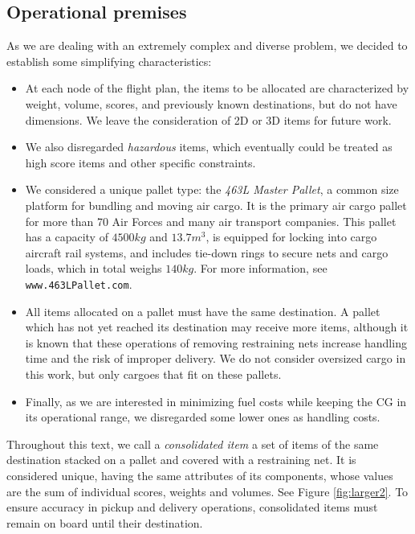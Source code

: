 \documentclass[preprint,authoryear]{elsarticle}
\begin{document}
\subsection{Operational premises}

As we are dealing with an extremely complex and diverse problem, we decided to establish some simplifying characteristics:

\begin{itemize}
	
	\item At each node of the flight plan, the items to be allocated are characterized by weight, volume, scores, and previously known destinations, but do not have dimensions. We leave the consideration of 2D or 3D items for future work.
	
	\item We also disregarded {\it hazardous} items, which eventually could be treated as high score items and other specific constraints.
	
	\item We considered a unique pallet type: the {\it 463L Master Pallet}, a common size platform for bundling and moving air cargo. It is the primary air cargo pallet for more than 70 Air Forces and many air transport companies. This pallet has a capacity of $4500 kg$ and $13.7 m^3$, is equipped for locking into cargo aircraft rail systems, and includes tie-down rings to secure nets and cargo loads, which in total weighs $140 kg$. For more information, see {\tt www.463LPallet.com}.
	
	\item All items allocated on a pallet must have the same destination. A pallet which has not yet reached its destination may receive more items, although it is known that these operations of removing restraining nets increase handling time and the risk of improper delivery. We do not consider oversized cargo in this work, but only cargoes that fit on these pallets.

	\item Finally, as we are interested in minimizing fuel costs while keeping the CG in its operational range, we disregarded some lower ones as handling costs.

\end{itemize}

Throughout this text, we call a {\it consolidated item} a set of items of the same destination stacked on a pallet and covered with a restraining net. It is considered unique, having the same attributes of its components, whose values are the sum of individual scores, weights and volumes. See Figure \ref{fig:larger2}. To ensure accuracy in pickup and delivery operations, consolidated items must remain on board until their destination.
\end{document}

